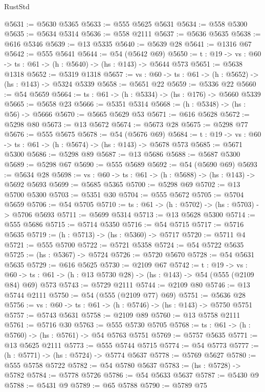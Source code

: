 \begin{lexlean}{RustStd}
\begin{coremodule}
@5631 := @5630 @5365
@5633 := @555 @5625 @5631
@5634 := @558 @5300
@5635 := @5634 @5314
@5636 := @558 @2111
@5637 := @5636 @5635
@5638 := @616 @5346
@5639 := @13 @5335
@5640 := @5639 @28
@5641 := @1316 @67
@5642 := @555 @5641
@5644 := @54 (@5642 @69)
@5650 := {t : @19} -> {vs : @60} -> {ts : @61} -> (h : @5640) -> (hs : @143) -> @5644 @573
@5651 := @5638 @1318
@5652 := @5319 @1318
@5657 := {vs : @60} -> {ts : @61} -> (h : @5652) -> (hs : @143) -> @5324 @5339
@5658 := @5651 @22
@5659 := @5336 @22
@5660 := @54 @5659
@5664 := {ts : @61} -> (h : @5334) -> (hs : @176) -> @5660 @5339
@5665 := @5658 @23
@5666 := @5351 @5314
@5668 := (h : @5348) -> (hs : @56) -> @5666
@5670 := @5665 @5629 @53
@5671 := @616 @5628
@5672 := @5298 @80
@5673 := @13 @5672
@5674 := @5673 @28
@5675 := @5298 @77
@5676 := @555 @5675
@5678 := @54 (@5676 @69)
@5684 := {t : @19} -> {vs : @60} -> {ts : @61} -> (h : @5674) -> (hs : @143) -> @5678 @573
@5685 := @5671 @5300
@5686 := @5298 @89
@5687 := @13 @5686
@5688 := @5687 @5300
@5689 := @5298 @67
@5690 := @555 @5689
@5692 := @54 (@5690 @69)
@5693 := @5634 @28
@5698 := {vs : @60} -> {ts : @61} -> (h : @5688) -> (hs : @143) -> @5692 @5693
@5699 := @5685 @5365
@5700 := @5298 @69
@5702 := @13 @5700 @5300
@5703 := @5351 @30
@5704 := @555 @5672
@5705 := @5704 @5659
@5706 := @54 @5705
@5710 := {ts : @61} -> (h : @5702) -> (hs : @5703) -> @5706 @5693
@5711 := @5699 @5314
@5713 := @13 @5628 @5300
@5714 := @555 @5686
@5715 := @5714 @5350
@5716 := @54 @5715
@5717 := @5716 @5635
@5719 := (h : @5713) -> (hs : @5360) -> @5717
@5720 := @5711 @4
@5721 := @555 @5700
@5722 := @5721 @5358
@5724 := @54 @5722 @5635
@5725 := (hs : @5367) -> @5724
@5726 := @5720 @5670
@5728 := @54 @5631 @5635
@5729 := @616 @5625
@5730 := @2109 @67
@5742 := {t : @19} ->
  {vs : @60} -> {ts : @61} -> (h : @13 @5730 @28) -> (hs : @143) -> @54 (@555 (@2109 @84) @69) @573
@5743 := @5729 @2111
@5744 := @2109 @80
@5746 := @13 @5744 @2111
@5750 := @54 (@555 (@2109 @77) @69)
@5751 := @5636 @28
@5756 := {vs : @60} -> {ts : @61} -> (h : @5746) -> (hs : @143) -> @5750 @5751
@5757 := @5743 @5631
@5758 := @2109 @89
@5760 := @13 @5758 @2111
@5761 := @5716 @30
@5763 := @555 @5730 @5705
@5768 := {ts : @61} -> (h : @5760) -> (hs : @5761) -> @54 @5763 @5751
@5769 := @5757 @5635
@5771 := @13 @5625 @2111
@5773 := @555 @5744 @5715
@5774 := @54 @5773
@5777 := (h : @5771) -> (hs : @5724) -> @5774 @5637
@5778 := @5769 @5627
@5780 := @555 @5758 @5722
@5782 := @54 @5780 @5637
@5783 := (hs : @5728) -> @5782
@5784 := @5778 @5726
@5786 := @54 @5633 @5637
@5787 := @5430 @9
@5788 := @5431 @9
@5789 := @65 @5788
@5790 := @5789 @75

\end{coremodule}
\end{lexlean}
